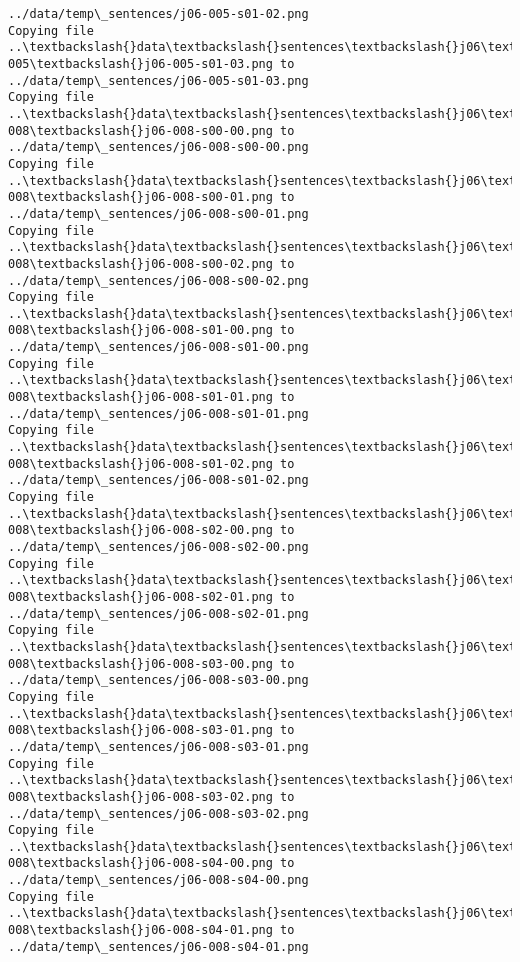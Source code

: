 \documentclass[11pt]{article}
\begin{document}
\begin{Verbatim}[commandchars=\\\{\}]
../data/temp\_sentences/j06-005-s01-02.png
Copying file ..\textbackslash{}data\textbackslash{}sentences\textbackslash{}j06\textbackslash{}j06-005\textbackslash{}j06-005-s01-03.png to
../data/temp\_sentences/j06-005-s01-03.png
Copying file ..\textbackslash{}data\textbackslash{}sentences\textbackslash{}j06\textbackslash{}j06-008\textbackslash{}j06-008-s00-00.png to
../data/temp\_sentences/j06-008-s00-00.png
Copying file ..\textbackslash{}data\textbackslash{}sentences\textbackslash{}j06\textbackslash{}j06-008\textbackslash{}j06-008-s00-01.png to
../data/temp\_sentences/j06-008-s00-01.png
Copying file ..\textbackslash{}data\textbackslash{}sentences\textbackslash{}j06\textbackslash{}j06-008\textbackslash{}j06-008-s00-02.png to
../data/temp\_sentences/j06-008-s00-02.png
Copying file ..\textbackslash{}data\textbackslash{}sentences\textbackslash{}j06\textbackslash{}j06-008\textbackslash{}j06-008-s01-00.png to
../data/temp\_sentences/j06-008-s01-00.png
Copying file ..\textbackslash{}data\textbackslash{}sentences\textbackslash{}j06\textbackslash{}j06-008\textbackslash{}j06-008-s01-01.png to
../data/temp\_sentences/j06-008-s01-01.png
Copying file ..\textbackslash{}data\textbackslash{}sentences\textbackslash{}j06\textbackslash{}j06-008\textbackslash{}j06-008-s01-02.png to
../data/temp\_sentences/j06-008-s01-02.png
Copying file ..\textbackslash{}data\textbackslash{}sentences\textbackslash{}j06\textbackslash{}j06-008\textbackslash{}j06-008-s02-00.png to
../data/temp\_sentences/j06-008-s02-00.png
Copying file ..\textbackslash{}data\textbackslash{}sentences\textbackslash{}j06\textbackslash{}j06-008\textbackslash{}j06-008-s02-01.png to
../data/temp\_sentences/j06-008-s02-01.png
Copying file ..\textbackslash{}data\textbackslash{}sentences\textbackslash{}j06\textbackslash{}j06-008\textbackslash{}j06-008-s03-00.png to
../data/temp\_sentences/j06-008-s03-00.png
Copying file ..\textbackslash{}data\textbackslash{}sentences\textbackslash{}j06\textbackslash{}j06-008\textbackslash{}j06-008-s03-01.png to
../data/temp\_sentences/j06-008-s03-01.png
Copying file ..\textbackslash{}data\textbackslash{}sentences\textbackslash{}j06\textbackslash{}j06-008\textbackslash{}j06-008-s03-02.png to
../data/temp\_sentences/j06-008-s03-02.png
Copying file ..\textbackslash{}data\textbackslash{}sentences\textbackslash{}j06\textbackslash{}j06-008\textbackslash{}j06-008-s04-00.png to
../data/temp\_sentences/j06-008-s04-00.png
Copying file ..\textbackslash{}data\textbackslash{}sentences\textbackslash{}j06\textbackslash{}j06-008\textbackslash{}j06-008-s04-01.png to
../data/temp\_sentences/j06-008-s04-01.png

\end{Verbatim}
\end{document}
